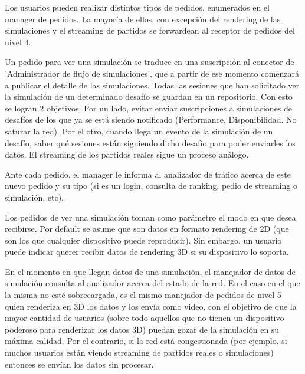Los usuarios pueden realizar distintos tipos de pedidos, enumerados en el manager de pedidos. La mayoría de ellos, con excepción del rendering de las simulaciones y el streaming de partidos se forwardean al receptor de pedidos del nivel 4.

Un pedido para ver una simulación se traduce en una suscripción al conector de 'Administrador de flujo de simulaciones', que a partir de ese momento comenzará a publicar el detalle de las simulaciones. Todas las sesiones que han solicitado ver la simulación de un determinado desafío se guardan en un repositorio. Con esto se logran 2 objetivos: Por un lado, evitar enviar suscripciones a simulaciones de desafíos de los que ya se está siendo notificado (Performance, Disponibilidad. No saturar la red). Por el otro, cuando llega un evento de la simulación de un desafío, saber qué sesiones están siguiendo dicho desafío para poder enviarles los datos.
El streaming de los partidos reales sigue un proceso análogo.

Ante cada pedido, el manager le informa al analizador de tráfico acerca de este nuevo pedido y su tipo (si es un login, consulta de ranking, pedio de streaming o simulación, etc).

Los pedidos de ver una simulación toman como parámetro el modo en que desea recibirse. Por default se asume que son datos en formato rendering de 2D (que son los que cualquier dispositivo puede reproducir). Sin embargo, un usuario puede indicar querer recibir datos de rendering 3D si su dispositivo lo soporta.

En el momento en que llegan datos de una simulación, el manejador de datos de simulación consulta al analizador acerca del estado de la red. En el caso en el que la misma no esté sobrecargada, es el mismo manejador de pedidos de nivel 5 quien renderiza en 3D los datos y los envía como video, con el objetivo de que la mayor cantidad de usuarios (sobre todo aquellos que no tienen un dispositivo poderoso para renderizar los datos 3D) puedan gozar de la simulación en su máxima calidad. Por el contrario, si la red está congestionada (por ejemplo, si muchos usuarios están viendo streaming de partidos reales o simulaciones) entonces se envían los datos sin procesar.
